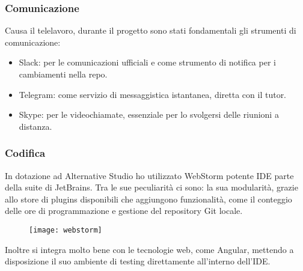 \subsubsection{Comunicazione}
Causa il telelavoro, durante il progetto sono stati fondamentali gli strumenti di comunicazione:
\begin{itemize}
  \item Slack: per le comunicazioni ufficiali e come strumento di notifica per i cambiamenti nella repo.
  \item Telegram: come servizio di messaggistica istantanea, diretta con il tutor.
	\item Skype: per le videochiamate, essenziale per lo svolgersi delle riunioni a distanza.
\end{itemize}

\subsubsection{Codifica}
In dotazione ad Alternative Studio ho utilizzato WebStorm potente IDE parte della suite di JetBrains. Tra le sue peculiarità ci sono: la sua modularità, grazie allo store di plugins disponibili che aggiungono funzionalità, come il conteggio delle ore di programmazione e gestione del repository \gls{Git} locale.

\begin{figure}[htbp]
\begin{center}
\texttt{[image: webstorm]}
\end{center}
\end{figure}

Inoltre si integra molto bene con le tecnologie web, come Angular, mettendo a disposizione il suo ambiente di testing direttamente all'interno dell'IDE.

